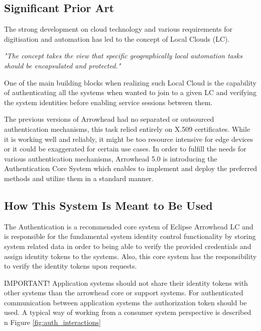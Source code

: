 \documentclass[a4paper]{arrowhead}
\begin{document}
\subsection{Significant Prior Art}
\label{sec:prior_art}

The strong development on cloud technology and various requirements for digitisation and automation has led to the concept of Local Clouds (LC).

\textit{"The concept takes the view that specific geographically local automation tasks should be encapsulated and protected."} \cite{jerker2017localclouds}

One of the main building blocks when realizing such Local Cloud is the capability of authenticating all the systems when wanted to join to a given LC and verifying the system identities before enabling service sessions between them. 

The previous versions of Arrowhead had no separated or outsourced authentication mechanisms, this task relied entirely on X.509 certificates. While it is working well and reliably, it might be too resource intensive for edge devices or it could be exaggerated for certain use cases. In order to fulfill the needs for various authentication mechanisms, Arrowhead 5.0 is introducing the Authentication Core System which enables to implement and deploy the preferred methods and utilize them in a standard manner.

\subsection{How This System Is Meant to Be Used}
\label{sec:use}

The Authentication is a recommended core system of Eclipse Arrowhead LC and is responsible for the fundamental system identity control functionality by storing system related data in order to being able to verify the provided credentials and assign identity tokens to the systems. Also, this core system has the responsibility to verify the identity tokens upon requests. 

IMPORTANT! Application systems should not share their identity tokens with other systems than the arrowhead core or support systems. For authenticated communication between application systems the authorization token should be used. A typical way of working from a consumer system perspective is described n Figure \ref{fig:auth_interactions}
\end{document}
